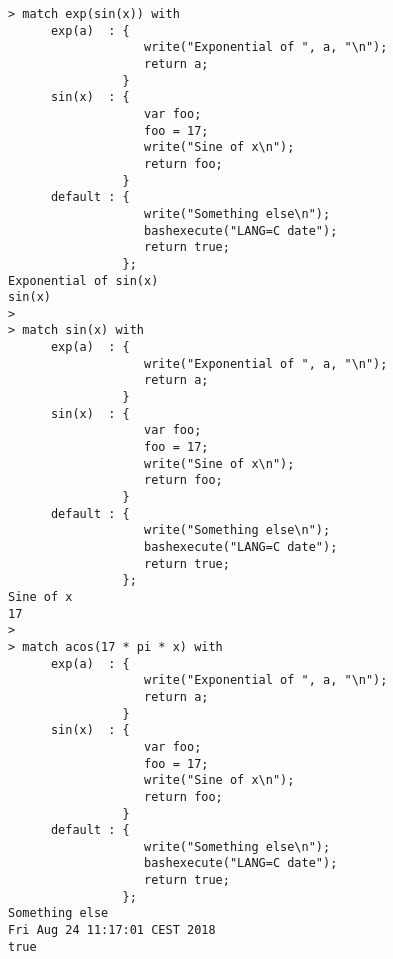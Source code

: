 \begin{center}\begin{minipage}{15cm}\begin{Verbatim}[frame=single]
> match exp(sin(x)) with
      exp(a)  : { 
                   write("Exponential of ", a, "\n");
                   return a;
                }
      sin(x)  : {
                   var foo;
                   foo = 17;
                   write("Sine of x\n");
                   return foo;
                }
      default : {
                   write("Something else\n");
                   bashexecute("LANG=C date");
                   return true;
                };
Exponential of sin(x)
sin(x)
> 
> match sin(x) with
      exp(a)  : { 
                   write("Exponential of ", a, "\n");
                   return a;
                }
      sin(x)  : {
                   var foo;
                   foo = 17;
                   write("Sine of x\n");
                   return foo;
                }
      default : {
                   write("Something else\n");
                   bashexecute("LANG=C date");
                   return true;
                };
Sine of x
17
> 
> match acos(17 * pi * x) with
      exp(a)  : { 
                   write("Exponential of ", a, "\n");
                   return a;
                }
      sin(x)  : {
                   var foo;
                   foo = 17;
                   write("Sine of x\n");
                   return foo;
                }
      default : {
                   write("Something else\n");
                   bashexecute("LANG=C date");
                   return true;
                };
Something else
Fri Aug 24 11:17:01 CEST 2018
true
\end{Verbatim}
\end{minipage}\end{center}
